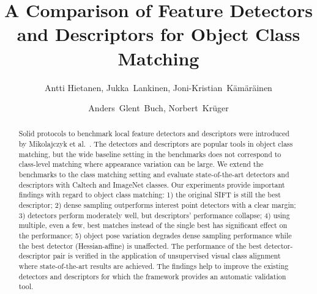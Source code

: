 \documentclass[review]{elsarticle}
\begin{document}
\begin{frontmatter}

\title{A Comparison of Feature Detectors and Descriptors for Object Class Matching}

\author{Antti Hietanen, Jukka~Lankinen, Joni-Kristian~K\"am\"ar\"ainen}
\address{Department of Signal Processing, Tampere University of Technology}
\author{Anders~Glent~Buch, Norbert~Kr\"uger}
\address{Maersk Mc-Kinney Moller Institute, University of Southern Denmark}

%
%
%

\begin{abstract}
Solid protocols to benchmark local
feature detectors and descriptors were introduced
by Mikolajczyk et al.~\cite{MikTuySch:2005,MikSch:2005}.
The detectors and descriptors are popular tools in
object class matching, but the
wide baseline setting in the benchmarks does not
correspond to class-level matching where appearance variation
can be large. 
We extend the benchmarks to the class matching setting
and evaluate state-of-the-art detectors and descriptors
with Caltech and ImageNet classes. Our experiments
provide important findings with regard
to object class matching:
1) the original SIFT is still the best descriptor;
2) dense sampling outperforms interest point detectors with a
clear margin;
3) detectors perform moderately well, but descriptors'
performance collapse;
4) using multiple, even a few, best matches instead of the single
best has significant effect on the performance;
5) object pose variation degrades dense sampling performance
while the best detector (Hessian-affine) is unaffected.
The performance of the best detector-descriptor pair is verified
in the application of unsupervised visual class
alignment where state-of-the-art results are achieved.
The findings help to improve the existing detectors and descriptors
for which the framework provides an automatic validation tool.
\end{abstract}


\end{frontmatter}
\end{document}
